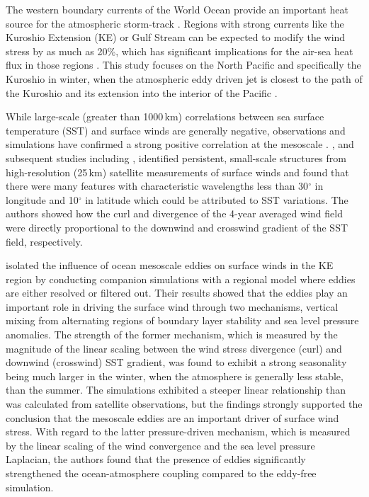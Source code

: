 
The western boundary currents of the World Ocean provide an important heat source for the atmospheric storm-track \citep{hoskins1990existence}. Regions with strong currents like the Kuroshio Extension (KE) or Gulf Stream can be expected to modify the wind stress by as much as 20\%, which has significant implications for the air-sea heat flux in those regions \citep{Chelton2004}. This study focuses on the North Pacific and specifically the Kuroshio in winter, when the atmospheric eddy driven jet is closest to the path of the Kuroshio and its extension into the interior of the Pacific \citep{nakamura2004observed}. 




While large-scale (greater than 1000\,km) correlations between sea surface temperature (SST) and surface winds are generally negative, observations and simulations have confirmed a strong positive correlation at the mesoscale \citep{chelton2010coupled}. \citet{Chelton2004}, and subsequent studies including \citet{ONeill2010}, identified persistent, small-scale structures from high-resolution (25\,km) satellite measurements of surface winds and found that there were many features with characteristic wavelengths less than 30$^{\circ}$ in longitude and 10$^{\circ}$ in latitude which could be attributed to SST variations. The authors showed how the curl and divergence of the 4-year averaged wind field were directly proportional to the downwind and crosswind gradient of the SST field, respectively.\par

\citet{putrasahan2013isolating} isolated the influence of ocean mesoscale eddies on surface winds in the KE region by conducting companion simulations with a regional model where eddies are either resolved or filtered out. Their results showed that the eddies play an important role in driving the surface wind through two mechanisms, vertical mixing from alternating regions of boundary layer stability and sea level pressure anomalies. The strength of the former mechanism, which is measured by the magnitude of the linear scaling between the wind stress divergence (curl) and downwind (crosswind) SST gradient, was found to exhibit a strong seasonality being much larger in the winter, when the atmosphere is generally less stable, than the summer. The simulations exhibited a steeper linear relationship than was calculated from satellite observations, but the findings strongly supported the conclusion that the mesoscale eddies are an important driver of surface wind stress. With regard to the latter pressure-driven mechanism, which is measured by the linear scaling of the wind convergence and the sea level pressure Laplacian, the authors found that the presence of eddies significantly strengthened the ocean-atmosphere coupling compared to the eddy-free simulation.\par



